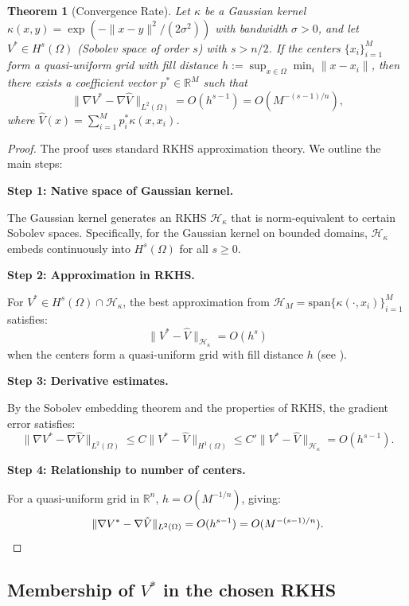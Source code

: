 \documentclass[11pt]{article}
\newtheorem{theorem}{Theorem}[section]
\newcommand{\real}{\mathbb{R}}
\begin{document}
\begin{theorem}[Convergence Rate]
\label{thm:convergence}
Let $\kappa$ be a Gaussian kernel $\kappa(x, y) = \exp(-\|x-y\|^2/(2\sigma^2))$ with bandwidth $\sigma > 0$, and let $V^* \in H^s(\Omega)$ (Sobolev space of order $s$) with $s > n/2$. If the centers $\{x_i\}_{i=1}^M$ form a quasi-uniform grid with fill distance $h := \sup_{x \in \Omega} \min_i \|x - x_i\|$, then there exists a coefficient vector $p^* \in \real^M$ such that
\begin{equation}
\|\nabla V^* - \nabla \hat{V}\|_{L^2(\Omega)} = O(h^{s-1}) = O(M^{-(s-1)/n}),
\label{eq:convergence_rate}
\end{equation}
where $\hat{V}(x) = \sum_{i=1}^M p_i^* \kappa(x, x_i)$.
\end{theorem}

\begin{proof}
The proof uses standard RKHS approximation theory. We outline the main steps:

\textbf{Step 1: Native space of Gaussian kernel.}

The Gaussian kernel generates an RKHS $\mathcal{H}_\kappa$ that is norm-equivalent to certain Sobolev spaces. Specifically, for the Gaussian kernel on bounded domains, $\mathcal{H}_\kappa$ embeds continuously into $H^s(\Omega)$ for all $s \geq 0$.

\textbf{Step 2: Approximation in RKHS.}

For $V^* \in H^s(\Omega) \cap \mathcal{H}_\kappa$, the best approximation from $\mathcal{H}_M = \text{span}\{\kappa(\cdot, x_i)\}_{i=1}^M$ satisfies:
\[
\|V^* - \hat{V}\|_{\mathcal{H}_\kappa} = O(h^s)
\]
when the centers form a quasi-uniform grid with fill distance $h$ (see \cite{wendland_scattered}).

\textbf{Step 3: Derivative estimates.}

By the Sobolev embedding theorem and the properties of RKHS, the gradient error satisfies:
\[
\|\nabla V^* - \nabla \hat{V}\|_{L^2(\Omega)} \leq C \|V^* - \hat{V}\|_{H^1(\Omega)} \leq C' \|V^* - \hat{V}\|_{\mathcal{H}_\kappa} = O(h^{s-1}).
\]

\textbf{Step 4: Relationship to number of centers.}

For a quasi-uniform grid in $\real^n$, $h = O(M^{-1/n})$, giving:
\[
\|\nabla V^* - \nabla \hat{V}\|_{L^2(\Omega)} = O(h^{s-1}) = O(M^{-(s-1)/n}). \qedhere
\]
\end{proof}

\subsection{Membership of $V^*$ in the chosen RKHS}
\label{sec:rkhs_membership}
\end{document}
